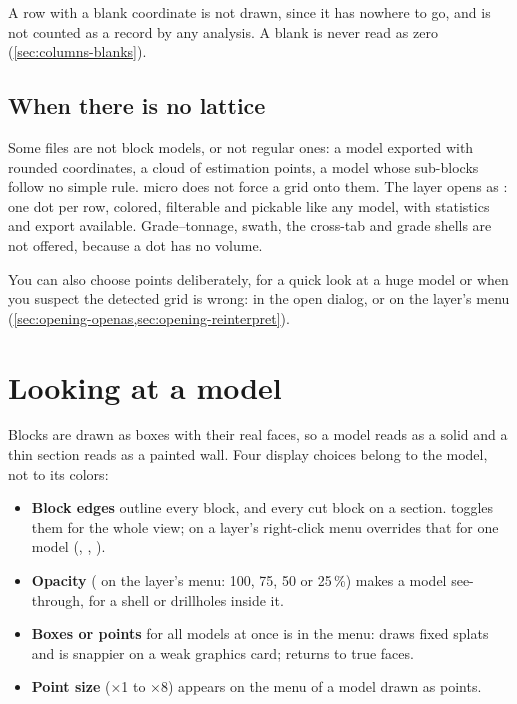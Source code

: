 \begin{note}
A row with a blank coordinate is not drawn, since it has nowhere to go, and is not counted as a record by any analysis. A blank is never read as zero (\cref{sec:columns-blanks}).
\end{note}

\subsection{When there is no lattice}

Some files are not block models, or not regular ones: a model exported with rounded coordinates, a cloud of estimation points, a model whose sub-blocks follow no simple rule. micro does not force a grid onto them. The layer opens as : one dot per row, colored, filterable and pickable like any model, with statistics and export available. Grade–tonnage, swath, the cross-tab and grade shells are not offered, because a dot has no volume.

You can also choose points deliberately, for a quick look at a huge model or when you suspect the detected grid is wrong:   in the open dialog, or  on the layer's menu (\cref{sec:opening-openas,sec:opening-reinterpret}).

\section{Looking at a model}\label{sec:blocks-display}

Blocks are drawn as boxes with their real faces, so a model reads as a solid and a thin section reads as a painted wall. Four display choices belong to the model, not to its colors:

\begin{itemize}
\item \textbf{Block edges} outline every block, and every cut block on a section.   toggles them for the whole view;  on a layer's right-click menu overrides that for one model (, , ).
\item \textbf{Opacity} ( on the layer's menu: 100, 75, 50 or 25\,\%) makes a model see-through, for a shell or drillholes inside it.
\item \textbf{Boxes or points} for all models at once is in the  menu:  draws fixed splats and is snappier on a weak graphics card;  returns to true faces.
\item \textbf{Point size} (×1 to ×8) appears on the menu of a model drawn as points.
\end{itemize}

